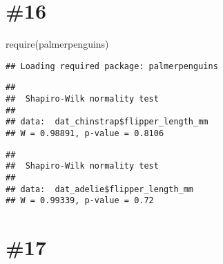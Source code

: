 \documentclass[
]{article}
\newenvironment{Shaded}{\begin{snugshade}}{\end{snugshade}}
\newcommand{\FunctionTok}[1]{\textcolor[rgb]{0.00,0.00,0.00}{#1}}
\newcommand{\NormalTok}[1]{#1}
\newcommand{\OtherTok}[1]{\textcolor[rgb]{0.56,0.35,0.01}{#1}}
\newcommand{\SpecialCharTok}[1]{\textcolor[rgb]{0.00,0.00,0.00}{#1}}
\newcommand{\StringTok}[1]{\textcolor[rgb]{0.31,0.60,0.02}{#1}}
\begin{document}
\hypertarget{section-15}{%
\section{\#16}\label{section-15}}

\begin{Shaded}
\begin{Highlighting}[]
\FunctionTok{require}\NormalTok{(palmerpenguins)}
\end{Highlighting}
\end{Shaded}

\begin{verbatim}
## Loading required package: palmerpenguins
\end{verbatim}

\begin{Shaded}
\end{Shaded}

\begin{verbatim}
## 
##  Shapiro-Wilk normality test
## 
## data:  dat_chinstrap$flipper_length_mm
## W = 0.98891, p-value = 0.8106
\end{verbatim}

\begin{Shaded}
\end{Shaded}

\begin{verbatim}
## 
##  Shapiro-Wilk normality test
## 
## data:  dat_adelie$flipper_length_mm
## W = 0.99339, p-value = 0.72
\end{verbatim}

\hypertarget{section-16}{%
\section{\#17}\label{section-16}}
\end{document}
